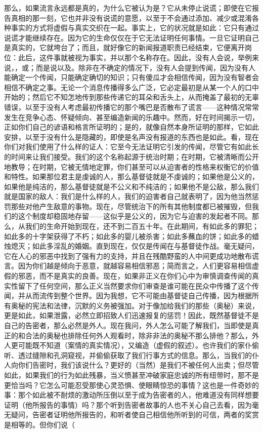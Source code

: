 那么，如果流言永远都是真的，为什么它被认为是？它从未停止说谎；即使在它报告真相的那一刻，它也并非没有说谎的意愿，以至于不会通过添加、减少或混淆各种事实的方式将虚假与真实交织在一起。事实上，它的状况就是如此：它只有通过说谎才能继续存在。因为它的生命仅仅在于它无法证明任何事情。一旦它证明自己是真实的，它就垮台了；而且，就好像它的新闻报道职责已经结束，它便离开岗位：此后，这件事就被视为事实，并以那个名称存在。因此，没有人会说，举例来说，，或；而是说以及。除非在不确定的情况下，没有人会提到传闻，因为没有人能确定一个传闻，只能确定确切的知识；只有傻瓜才会相信传闻，因为没有智者会相信不确定之事。无论一个消息传播得多么广泛，它必定最初是从某一个人的口中开始的；然后它不知怎地传到那些传递它的耳朵和舌头上，从而掩盖了最初的无辜错误，以至于没有人考虑最初传播它的那个嘴巴是否散布了谎言——这种情况常常发生在竞争心态、怀疑倾向、甚至编造新闻的乐趣中。然而，好在时间揭示一切，正如你们自己的谚语和格言所证明的；是的，就像自然本身所证明的那样，它如此安排，以至于没有什么是隐藏的，即使是名声没有报道的东西也是如此。看，现在你们对我们使用了什么样的证人：它至今无法证明它引发的传闻，尽管它有如此长的时间来让我们接受。我们的这个名称起源于统治时期；在时期，它被清晰而公开地教导；在时期，它被无情地定罪，你们甚至可以从迫害者的性格来权衡它的价值和特性。如果那位君主是虔诚的人，那么基督徒就是不虔诚的；如果他是公义的，如果他是纯洁的，那么基督徒就是不公义和不纯洁的；如果他不是公敌，那么我们就是国家的敌人：我们是什么样的人，我们的迫害者自己就表明了，因为他当然惩罚那些对他产生敌意的事物。现在，尽管统治下的所有其他制度都已被摧毁，但我们的这个制度却稳固地存留——这似乎是公义的，因为它与迫害的发起者不同。那么，从我们的生命开始到现在，还不到二百五十年。在此期间，有如此多的罪犯；如此多的十字架获得了不朽；如此多的婴儿被杀害；如此多蘸血的饼；如此多的蜡烛熄灭；如此多淫乱的婚姻。直到现在，仅仅是传闻在与基督徒作战。毫无疑问，它在人心的邪恶中找到了强有力的支持，并且在残酷野蛮的人中间更成功地散布谎言。因为你们越是倾向于恶意，就越容易相信邪恶；简而言之，人们更容易相信虚假的邪恶，而不是真实的良善。现在，如果非正义在你们心中为审慎调查传闻的真实性留下了任何空间，那么正义当然要求你们审查是谁可能在民众中传播了这个传闻，并从而流传到整个世界。因为我想，它不可能由基督徒自己传播，因为根据所有奥秘的宪法和法律，沉默的义务被强加。对于像加给我们的那些（奥秘）来说，更是如此，如果泄露，必然立即招致人们迅速报复的惩罚！因此，既然基督徒不是自己的告密者，那么必然是外人。现在我问，外人怎么可能了解我们，当即使是真正的和合法的奥秘也排除任何外人观看时，除非非法的奥秘不那么排他？那么，外人更可能既不知道（案情的真实情况），又编造（虚假的叙述）。也许我们的家仆偷听、透过缝隙和孔洞窥视，并偷偷获取了我们行事方式的信息。那么，当我们的仆人向你们告密时，我们该说什么？更好的（当然）是我们不被任何人出卖；但尽管如此，如果我们的行为如此残暴，当义愤甚至冲破家庭忠诚的所有纽带时，那不是更恰当吗？它怎么可能忍受那使心灵恐惧、使眼睛惊恐的事情？这也是一件奇妙的事：那个如此被不耐烦的激动所压倒以至于成为告密者的人，他难道没有同样想要证明（他所报告的事情）吗？那个听到告密者故事的人也不关心自己去看，因为毫无疑问，告密者证明他所报告的，和听者使自己相信他所听到的可信，两者的奖赏是相等的。但你们说（